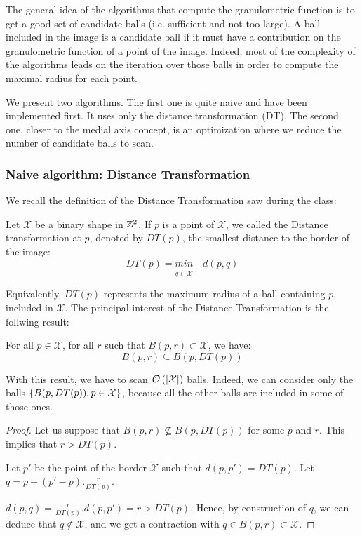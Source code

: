 The general idea of the algorithms that compute the granulometric function is to get a good set of candidate balls (i.e. sufficient and not too large). A ball included in the image is a candidate ball if it must have a contribution on the granulometric function of a point of the image. Indeed, most of the complexity of the algorithms leads on the iteration over those balls in order to compute the maximal radius for each point. 

We present two algorithms. The first one is quite naive and have been implemented first. It uses only the distance transformation (DT). The second one, closer to the medial axis concept, is an optimization where we reduce the number of candidate balls to scan.

\subsubsection{Naive algorithm: Distance Transformation}

We recall the definition of the Distance Transformation saw during the class:

\begin{definition}
Let $\mathcal{X}$ be a binary shape in $\mathbb{Z}^{2}$. If $p$ is a point of $\mathcal{X}$, we called the Distance transformation at $p$, denoted by $DT(p)$, the smallest distance to the border of the image:
$$ DT(p) = \underset{q \in \widetilde{\mathcal{X}}}{min} \quad d(p,q) $$
\end{definition}

Equivalently, $DT(p)$ represents the maximum radius of a ball containing $p$, included in $\mathcal{X}$. The principal interest of the Distance Transformation is the follwing result:

\begin{theoreme}\label{theoremDT}
	For all $p \in \mathcal{X}$, for all $r$ such that $B(p,r) \subset \mathcal{X}$, we have:
		$$ B(p,r) \subseteq B(p,DT(p))$$
\end{theoreme}

With this result, we have to scan $\mathcal O \left( \left| \mathcal{X} \right| \right)$ balls. Indeed, we can consider only the balls $\left\{ B(p,DT(p)), p \in \mathcal{X} \right\}$, because all the other balls are included in some of those ones.

\begin{proof}
	
Let us suppose that $B(p,r) \nsubseteq B(p,DT(p))$ for some $p$ and $r$. This implies that $r > DT(p)$.

Let $p'$ be the point of the border $\widetilde{\mathcal{X}}$ such that $d(p,p') = DT(p)$. Let $q = p + (p'-p).\frac{r}{DT(p)}.$ 

$d(p,q) = \frac{r}{DT(p)}.d(p,p') = r > DT(p)$. Hence, by construction of $q$, we can deduce that $q \notin \mathcal{X}$, and we get a contraction with $q \in B(p,r) \subset \mathcal{X}$. 

\end{proof}

